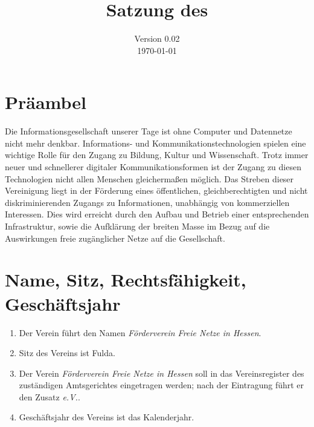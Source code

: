 \documentclass[ngerman]{article}
\title{Satzung des\\
\emph{\NameVerein}}
\date{Version 0.02\\
\today}
\newcommand{\NameVerein}{Förderverein Freie Netze in Hessen}
\begin{document}
\maketitle

\thispagestyle{empty}
\pagebreak

\section{Präambel}
Die Informationsgesellschaft unserer Tage ist ohne Computer und Datennetze nicht mehr denkbar. In\-for\-ma\-tions- und Kommunikationstechnologien spielen eine wichtige Rolle für den Zugang zu Bildung, Kultur und Wissenschaft. Trotz immer neuer und schnellerer digitaler Kommunikationsformen ist der Zugang zu diesen Technologien nicht allen Menschen gleichermaßen möglich. Das Streben dieser Vereinigung liegt in der Förderung eines öffentlichen, gleichberechtigten und nicht diskriminierenden Zugangs zu Informationen, unabhängig von kommerziellen Interessen. Dies wird erreicht durch den Aufbau und Betrieb einer entsprechenden Infrastruktur, sowie die Aufklärung der breiten Masse im Bezug auf die Auswirkungen freie zugänglicher Netze auf die Gesellschaft.


\section{Name, Sitz, Rechtsfähigkeit, Geschäftsjahr}
\begin{enumerate}
  \item Der Verein führt den Namen \emph{\NameVerein}.
  \item Sitz des Vereins ist Fulda.
  \item Der Verein \emph{\NameVerein} soll in das Vereinsregister des zuständigen Amtsgerichtes eingetragen werden; nach der Eintragung führt er den Zusatz \emph{e.V.}.
  \item Geschäftsjahr des Vereins ist das Kalenderjahr.
\end{enumerate}
\end{document}
